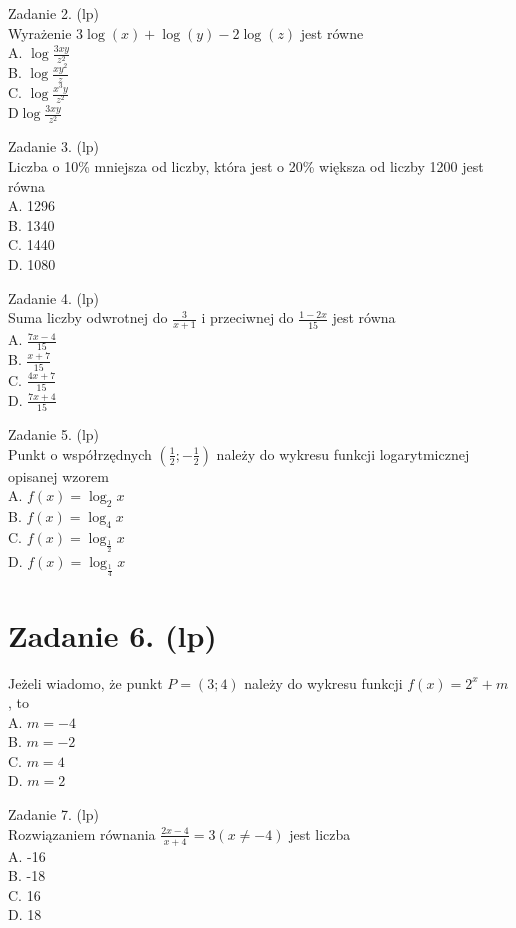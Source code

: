 \documentclass[10pt]{article}
\begin{document}
Zadanie 2. (lp)\\
Wyrażenie \(3 \log (x)+\log (y)-2 \log (z)\) jest równe\\
A. \(\log \frac{3 x y}{z^{2}}\)\\
B. \(\log \frac{x y^{2}}{z}\)\\
C. \(\log \frac{x^{3} y}{z^{2}}\)\\
\(\mathrm{D} \log \frac{3 x y}{z^{2}}\)

Zadanie 3. (lp)\\
Liczba o 10\% mniejsza od liczby, która jest o 20\% większa od liczby 1200 jest równa\\
A. 1296\\
B. 1340\\
C. 1440\\
D. 1080

Zadanie 4. (lp)\\
Suma liczby odwrotnej do \(\frac{3}{x+1}\) i przeciwnej do \(\frac{1-2 x}{15}\) jest równa\\
A. \(\frac{7 x-4}{15}\)\\
B. \(\frac{x+7}{15}\)\\
C. \(\frac{4 x+7}{15}\)\\
D. \(\frac{7 x+4}{15}\)

Zadanie 5. (lp)\\
Punkt o współrzędnych \(\left(\frac{1}{2} ;-\frac{1}{2}\right)\) należy do wykresu funkcji logarytmicznej opisanej wzorem\\
A. \(f(x)=\log _{2} x\)\\
B. \(f(x)=\log _{4} x\)\\
C. \(f(x)=\log _{\frac{1}{2}} x\)\\
D. \(f(x)=\log _{\frac{1}{4}} x\)

\section*{Zadanie 6. (lp)}
Jeżeli wiadomo, że punkt \(P=(3 ; 4)\) należy do wykresu funkcji \(f(x)=2^{x}+m\), to\\
A. \(m=-4\)\\
B. \(m=-2\)\\
C. \(m=4\)\\
D. \(m=2\)

Zadanie 7. (lp)\\
Rozwiązaniem równania \(\frac{2 x-4}{x+4}=3(x \neq-4)\) jest liczba\\
A. -16\\
B. -18\\
C. 16\\
D. 18
\end{document}
